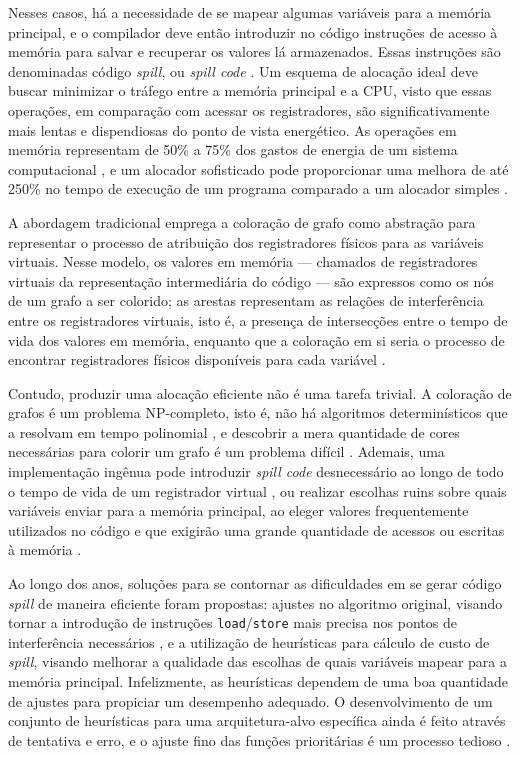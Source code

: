 \documentclass[
	12pt,				%
	openright,			%
	twoside,			%
	a4paper,			%
	tcc,			%
	]{ABNT-DC-UEL}
\begin{document}
Nesses casos, há a necessidade de se mapear algumas variáveis para a memória principal, e o compilador deve então introduzir no código instruções de acesso à memória para salvar e recuperar os valores lá armazenados. Essas instruções são denominadas código \textit{spill}, ou \textit{spill code} \cite{briggs:92}. Um esquema de alocação ideal deve buscar minimizar o tráfego entre a memória principal e a CPU, visto que essas operações, em comparação com acessar os registradores, são significativamente mais lentas e dispendiosas do ponto de vista energético. As operações em memória representam de 50\% a 75\% dos gastos de energia de um sistema computacional \cite{verma:06}, e um alocador sofisticado pode proporcionar uma melhora de até 250\% no tempo de execução de um programa comparado a um alocador simples \cite{pereira:08}.

A abordagem tradicional emprega a coloração de grafo como abstração para representar o processo de atribuição dos registradores físicos para as variáveis virtuais. Nesse modelo, os valores em memória --- chamados de registradores virtuais da representação intermediária do código --- são expressos como os nós de um grafo a ser colorido; as arestas representam as relações de interferência entre os registradores virtuais, isto é, a presença de intersecções entre o tempo de vida dos valores em memória, enquanto que a coloração em si seria o processo de encontrar registradores físicos disponíveis para cada variável \cite{chaitin:81}.

Contudo, produzir uma alocação eficiente não é uma tarefa trivial. A coloração de grafos é um problema NP-completo, isto é, não há algoritmos determinísticos que a resolvam em tempo polinomial \cite{karp:72}, e descobrir a mera quantidade de cores necessárias para colorir um grafo é um problema difícil \cite{garey:76}. Ademais, uma implementação ingênua pode introduzir \textit{spill code} desnecessário ao longo de todo o tempo de vida de um registrador virtual \cite{bergner:97}, ou realizar escolhas ruins sobre quais variáveis enviar para a memória principal, ao eleger valores frequentemente utilizados no código e que exigirão uma grande quantidade de acessos ou escritas à memória \cite{bernstein:89}.

Ao longo dos anos, soluções para se contornar as dificuldades em se gerar código \textit{spill} de maneira eficiente foram propostas: ajustes no algoritmo original, visando tornar a introdução de instruções \texttt{load}/\texttt{store} mais precisa nos pontos de interferência necessários \cite{chaitin:82, briggs:92, briggs2:92, cooper:98}, e a utilização de heurísticas para cálculo de custo de \textit{spill}, visando melhorar a qualidade das escolhas de quais variáveis mapear para a memória principal. Infelizmente, as heurísticas dependem de uma boa quantidade de ajustes para propiciar um desempenho adequado. O desenvolvimento de um conjunto de heurísticas para uma arquitetura-alvo específica ainda é feito através de tentativa e erro, e o ajuste fino das funções prioritárias é um processo tedioso \cite{amarasinghe:03}.
\end{document}
